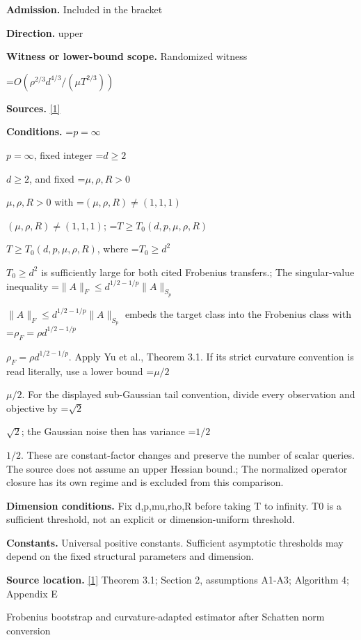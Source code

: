 \documentclass[10pt,a4paper]{article}
\newcommand{\AtlasMath}[1]{\par\begingroup\centering\setbox0=\hbox{$\displaystyle #1$}\ifdim\wd0>1.4\linewidth\typeout{ATLAS WIDE FORMULA: \the\wd0}\fi\ifdim\wd0>\linewidth\resizebox{\linewidth}{!}{\box0}\else\box0\fi\par\endgroup}
\newcommand{\AtlasInlineMath}[1]{\begingroup\setbox0=\hbox{$#1$}\ifdim\wd0>.4\linewidth\endgroup\AtlasMath{#1}\else\endgroup$#1$\fi}
\begin{document}
\textbf{Admission.} Included in the bracket



\textbf{Direction.} upper



\textbf{Witness or lower-bound scope.} Randomized witness



\AtlasMath{O(\rho^{2/3}d^{4/3}/(\mu T^{2/3}))}


\textbf{Sources.} \href{https://papers.nips.cc/paper_files/paper/2024/file/b444ad72520a5f5c467343be88e352ed-Paper-Conference.pdf}{[1]}



\textbf{Conditions.} \AtlasInlineMath{p=\infty}, fixed integer \AtlasInlineMath{d\ge2}, and fixed \AtlasInlineMath{\mu,\rho,R>0} with \AtlasInlineMath{(\mu,\rho,R)\ne(1,1,1)}; \AtlasInlineMath{T\ge T_0(d,p,\mu,\rho,R)}, where \AtlasInlineMath{T_0\ge d^2} is sufficiently large for both cited Frobenius transfers.; The singular-value inequality \AtlasInlineMath{\|A\|_F\le d^{1/2-1/p}\|A\|_{S_p}} embeds the target class into the Frobenius class with \AtlasInlineMath{\rho_F=\rho d^{1/2-1/p}}. Apply Yu et al., Theorem 3.1. If its strict curvature convention is read literally, use a lower bound \AtlasInlineMath{\mu/2}. For the displayed sub-Gaussian tail convention, divide every observation and objective by \AtlasInlineMath{\sqrt2}; the Gaussian noise then has variance \AtlasInlineMath{1/2}. These are constant-factor changes and preserve the number of scalar queries. The source does not assume an upper Hessian bound.; The normalized operator closure has its own regime and is excluded from this comparison.



\textbf{Dimension conditions.} Fix d,p,mu,rho,R before taking T to infinity. T0 is a sufficient threshold, not an explicit or dimension-uniform threshold.



\textbf{Constants.} Universal positive constants. Sufficient asymptotic thresholds may depend on the fixed structural parameters and dimension.



\textbf{Source location.} \href{https://papers.nips.cc/paper_files/paper/2024/file/b444ad72520a5f5c467343be88e352ed-Paper-Conference.pdf}{[1]} Theorem 3.1; Section 2, assumptions A1-A3; Algorithm 4; Appendix E



Frobenius bootstrap and curvature-adapted estimator after Schatten norm conversion
\end{document}
